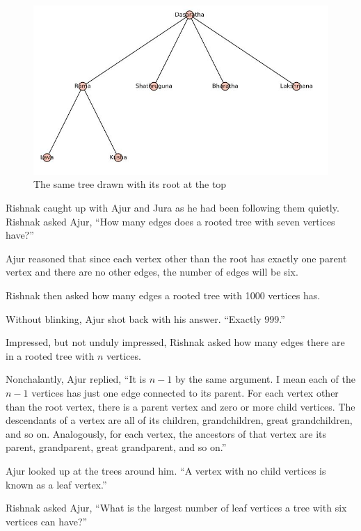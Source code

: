 \begin{figure}
\begin{center}
\includegraphics[width=\textwidth]{tree2.JPG}
\caption{The same tree drawn with its root at the top}\label{rg2}
\end{center}
\end{figure}

Rishnak caught up with Ajur and Jura as he had been following them quietly. Rishnak asked Ajur, ``How many edges does a rooted tree with seven vertices have?''

Ajur reasoned that since each vertex other than the root has exactly one parent vertex and there are no other edges, the number of edges will be six.

Rishnak then asked how many edges a rooted tree with 1000 vertices has.

Without blinking, Ajur shot back with his answer. ``Exactly 999.''

Impressed, but not unduly impressed, Rishnak asked how many edges there are in a rooted tree with $n$ vertices.

Nonchalantly, Ajur replied, ``It is $n-1$ by the same argument. I mean each of the $n-1$ vertices has just one edge connected to its parent. For each vertex other than the root vertex, there is a parent vertex and zero or more child vertices.  The descendants of a vertex are all of its children, grandchildren, great grandchildren, and so on. Analogously, for each vertex, the ancestors of that vertex are its parent, grandparent, great grandparent, and so on.''

Ajur looked up at the trees around him.  ``A vertex with no child vertices is known as a leaf vertex.''

Rishnak asked Ajur, ``What is the largest number of leaf vertices a tree with six vertices can have?''

